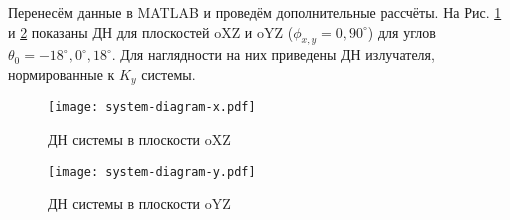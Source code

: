 \setcounter{chapter}{2}
\setcounter{figure}{0}

Перенесём данные в MATLAB и проведём дополнительные рассчёты.
 На Рис. \ref{fig:system-diagram-x} и \ref{fig:system-diagram-y} показаны ДН для плоскостей oXZ и oYZ ($\phi_{x,y}=0, 90^\circ$) для углов $\theta_0=-18^\circ, 0^\circ, 18^\circ$. Для наглядности на них приведены ДН излучателя, нормированные к $K_y$ системы. 

\begin{figure}[H]
	\centering
	\texttt{[image: system-diagram-x.pdf]}
	\caption{ДН системы в плоскости oXZ}
	\label{fig:system-diagram-x}
\end{figure}

\begin{figure}[H]
	\centering
	\texttt{[image: system-diagram-y.pdf]}
	\caption{ДН системы в плоскости oYZ}
	\label{fig:system-diagram-y}
\end{figure}